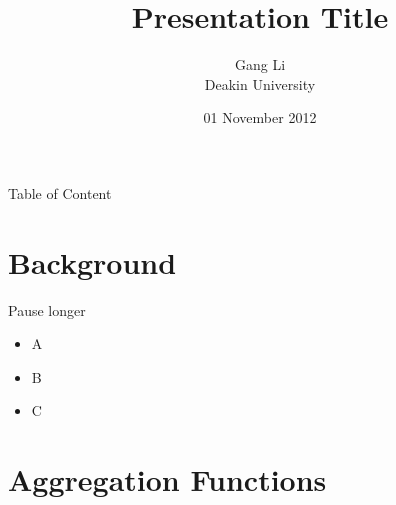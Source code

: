 \documentclass[
 size=12pt,
 paper=smartboard, %
 mode=present, %
 display=slides, %
 style=tulip,  %
 pauseslide,
 fleqn,leqno,clock]{powerdot}
\title{Presentation Title}
\author{Gang Li  
\\
Deakin University 
}
\date{01 November 2012}
\begin{document}
\maketitle 

\begin{slide}[toc=,bm=]{Table of Content}
 \tableofcontents[type=1,content=futuresections]
\end{slide}

\section{Background}

\begin{slide}{Pause longer}
\begin{itemize}
\item A \pause
\item B \pause[2]
\item C
\end{itemize}
\end{slide}


\section{Aggregation Functions}
\end{document}
